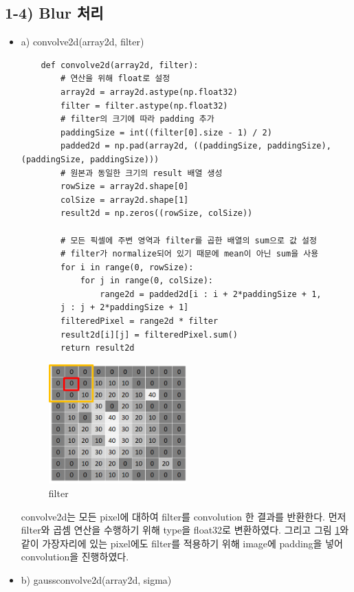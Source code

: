 \documentclass[]{report}
\begin{document}
\subsection*{1-4) Blur 처리}
\begin{itemize}
	\item a) convolve2d(array2d, filter)
	\begin{lstlisting}
	def convolve2d(array2d, filter):
		# 연산을 위해 float로 설정
		array2d = array2d.astype(np.float32) 
		filter = filter.astype(np.float32)
		# filter의 크기에 따라 padding 추가
		paddingSize = int((filter[0].size - 1) / 2)
		padded2d = np.pad(array2d, ((paddingSize, paddingSize), (paddingSize, paddingSize)))
		# 원본과 동일한 크기의 result 배열 생성 
		rowSize = array2d.shape[0]
		colSize = array2d.shape[1]
		result2d = np.zeros((rowSize, colSize))
		
		# 모든 픽셀에 주변 영역과 filter를 곱한 배열의 sum으로 값 설정
		# filter가 normalize되어 있기 때문에 mean이 아닌 sum을 사용
		for i in range(0, rowSize):
			for j in range(0, colSize):
				range2d = padded2d[i : i + 2*paddingSize + 1,
		j : j + 2*paddingSize + 1]
		filteredPixel = range2d * filter
		result2d[i][j] = filteredPixel.sum()
		return result2d
	\end{lstlisting}
	
	\begin{figure}[ht!]
		\centering
		\includegraphics[width=0.5\textwidth]{image/filter.png}
		\caption{filter}
		\label{filter}
	\end{figure}
	convolve2d는 모든 pixel에 대하여 filter를 convolution 한 결과를 반환한다. 먼저 filter와 곱셈 연산을 수행하기 위해 type을 float32로 변환하였다. 그리고 그림 \ref{filter}와 같이 가장자리에 있는 pixel에도 filter를 적용하기 위해 image에 padding을 넣어 convolution을 진행하였다. \\

	\item b) gaussconvolve2d(array2d, sigma)
	

\end{itemize}
\end{document}
